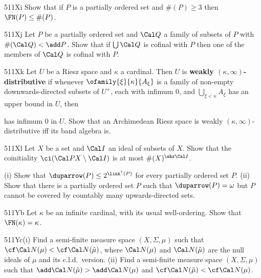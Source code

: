 {\spheader 511Xi Show that if $P$ is a partially ordered set and
$\#(P)\ge 3$ then $\FN(P)\le\#(P)$.   

\spheader 511Xj Let $P$ be a partially ordered set and $\Cal Q$ a
family of subsets of $P$ with $\#(\Cal Q)<\add P$.   Show that if
$\bigcup\Cal Q$ is cofinal with $P$ then one of the members of $\Cal Q$
is cofinal with $P$.

\spheader 511Xk Let $U$ be a Riesz space and $\kappa$ a cardinal.   Then
$U$ is {\bf weakly $(\kappa,\infty)$-distributive} if
whenever $\ofamily{\xi}{\kappa}{A_{\xi}}$ is a family of non-empty
downwards-directed subsets of $U^+$, each with infimum $0$, and
$\bigcup_{\xi<\kappa}A_{\xi}$ has an upper bound in $U$, then


\noindent has infimum $0$ in $U$.   Show that an Archimedean Riesz space
is weakly $(\kappa,\infty)$-distributive iff its band algebra is.

\spheader 511Xl Let $X$ be a set and $\Cal I$ an ideal of
subsets of $X$.   Show that the coinitiality $\ci(\Cal PX\setminus\Cal I)$
is at most $\#(X)^{\shr\Cal I}$.

(i)
Show that $\duparrow(P)\le 2^{\link^{\uparrow}(P)}$ for every
partially ordered set $P$.
(ii) Show that there is a partially ordered set $P$ such that
$\duparrow(P)=\omega$ but $P$ cannot be covered by countably many
upwards-directed sets.

\spheader 511Yb Let $\kappa$ be an infinite cardinal, with its usual
well-ordering.  Show that $\FN(\kappa)=\kappa$.

\spheader 511Yc(i) Find a semi-finite measure space $(X,\Sigma,\mu)$
such that $\cf\Cal N(\mu)<\cf\Cal N(\tilde\mu)$, where $\Cal N(\mu)$ and
$\Cal N(\tilde\mu)$
are the null ideals of $\mu$ and its c.l.d.\ version.
(ii) Find a semi-finite measure space $(X,\Sigma,\mu)$ such that
$\add\Cal N(\tilde\mu)>\add\Cal N(\mu)$ and
$\cf\Cal N(\tilde\mu)<\cf\Cal N(\mu)$.
}%

